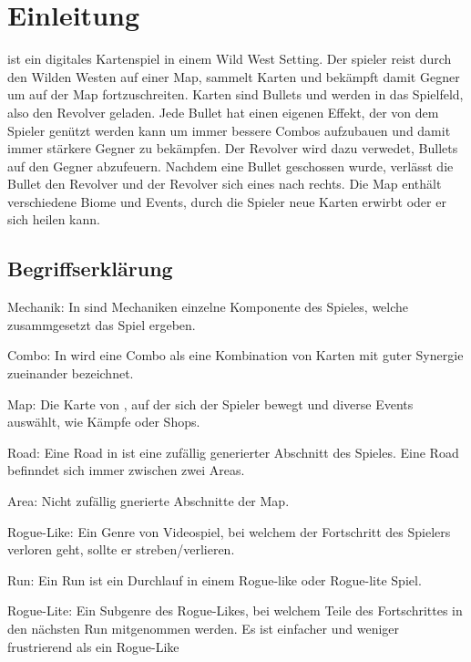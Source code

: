 
\section{Einleitung}\label{sec:einleitung}

\renewcommand{\kapitelautor}{Autor: Philip Jankovic}


\FF ist ein digitales Kartenspiel in einem Wild West Setting. Der spieler reist durch den Wilden Westen auf einer Map,
sammelt Karten und bekämpft damit Gegner um auf der Map fortzuschreiten. Karten sind Bullets und werden in das Spielfeld, also den Revolver geladen.
Jede Bullet hat einen eigenen Effekt, der von dem Spieler genützt werden kann um immer bessere Combos aufzubauen und damit immer stärkere Gegner zu bekämpfen.
Der Revolver wird dazu verwedet, Bullets auf den Gegner abzufeuern. Nachdem eine Bullet geschossen wurde, verlässt die Bullet den Revolver und der Revolver sich eines nach rechts.
Die Map enthält verschiedene Biome und Events, durch die Spieler neue Karten erwirbt oder er sich heilen kann.



\subsection{Begriffserklärung}\label{begriffserklärung}
Mechanik: In \FF sind Mechaniken einzelne Komponente des Spieles, welche zusammgesetzt das Spiel ergeben.

Combo: In \FF wird eine Combo als eine Kombination von Karten mit guter Synergie zueinander bezeichnet.


Map: Die Karte von \FF, auf der sich der Spieler bewegt und diverse Events auswählt, wie \zB Kämpfe oder Shops.

Road: Eine Road in \FF ist eine zufällig generierter Abschnitt des Spieles. Eine Road befinndet sich immer zwischen zwei Areas.

Area: Nicht zufällig gnerierte Abschnitte der \FF Map.

Rogue-Like: Ein Genre von Videospiel, bei welchem der Fortschritt des Spielers verloren geht, sollte er streben/verlieren.

Run: Ein Run ist ein Durchlauf in einem Rogue-like oder Rogue-lite Spiel. 

Rogue-Lite: Ein Subgenre des Rogue-Likes, bei welchem Teile des Fortschrittes in den nächsten Run mitgenommen werden.
Es ist einfacher und weniger frustrierend als ein Rogue-Like

%

\renewcommand{\kapitelautor}{}
